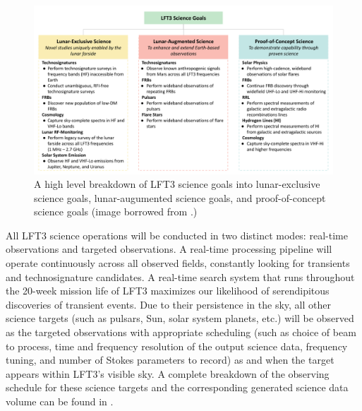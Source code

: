 \begin{figure}
	\centering
	\includegraphics[width=\linewidth]{figures/LFT3ScienceGoals2.png}
	\caption{A high level breakdown of LFT3 science goals into lunar-exclusive science goals, lunar-augumented science goals, and proof-of-concept science goals (image borrowed from \cite{prabu2025lft3}.)}
	\label{fig:sciencegoals}
\end{figure}

All LFT3 science operations will be conducted in two distinct modes: real-time observations and targeted observations. A real-time processing pipeline will operate continuously across all observed fields, constantly looking for transients and technosignature candidates. A real-time search system that runs throughout the 20-week mission life of LFT3 maximizes our likelihood of serendipitous discoveries of transient events. Due to their persistence in the sky, all other science targets (such as pulsars, Sun, solar system planets, etc.) will be observed as the targeted observations with appropriate scheduling (such as choice of beam to process, time and frequency resolution of the output science data, frequency tuning, and number of Stokes parameters to record) as and when the target appears within LFT3's visible sky. A complete breakdown of the observing schedule for these science targets and the corresponding generated science data volume can be found in \cite{prabu2025lft3}.

